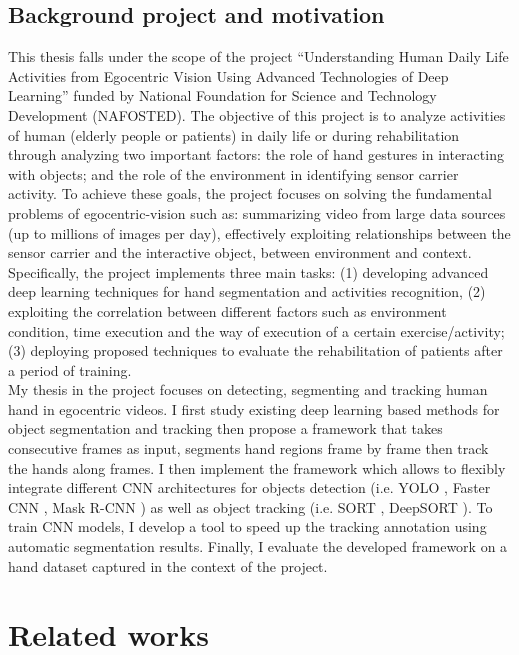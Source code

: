 \subsection{Background project and motivation} \label{subsec:bg}
This thesis falls under the scope of the project “Understanding Human Daily Life Activities from Egocentric Vision Using Advanced Technologies of Deep Learning” funded by National Foundation for Science and Technology Development (NAFOSTED). The objective of this project is to analyze activities of human (elderly people or patients) in daily life or during rehabilitation through analyzing two important factors: the role of hand gestures in interacting with objects; and the role of the environment in identifying sensor carrier activity.
To achieve these goals, the project focuses on solving the fundamental problems of egocentric-vision such as: summarizing video from large data sources (up to millions of images per day), effectively exploiting relationships between the sensor carrier and the interactive object, between environment and context. Specifically, the project implements three main tasks: (1) developing advanced deep learning techniques for hand segmentation and activities recognition, (2) exploiting the correlation between different factors such as  environment condition, time execution and the way of execution of a certain exercise/activity; (3) deploying proposed techniques to evaluate the rehabilitation of patients after a period of training.
\\My thesis in the project focuses on detecting, segmenting and tracking human hand in egocentric videos. I first study existing deep learning based methods for object segmentation and tracking then propose a framework that takes consecutive frames as input, segments hand regions frame by frame then track the hands along frames. I then implement the framework which allows to flexibly integrate different CNN architectures for objects detection (i.e. YOLO \cite{DBLP:journals/corr/RedmonDGF15}, Faster CNN \cite{DBLP:journals/corr/RenHG015}, Mask R-CNN \cite{DBLP:journals/corr/HeGDG17}) as well as object tracking (i.e. SORT \cite{DBLP:journals/corr/BewleyGORU16}, DeepSORT \cite{DBLP:journals/corr/WojkeBP17}). To train CNN models, I develop a tool to speed up the tracking annotation using automatic segmentation results. Finally, I evaluate the developed framework on a hand dataset captured in the context of the project.
\section{Related works}
